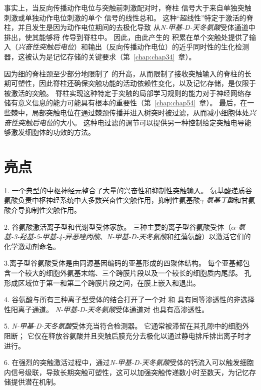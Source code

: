 事实上，当反向传播动作电位与突触前刺激配对时，脊柱  信号大于来自单独突触刺激或单独动作电位刺激的单个  信号的线性总和。
这种“超线性”特定于激活的脊柱，并且发生是因为动作电位期间的去极化导致  从\textit{N-甲基-D-天冬氨酸}受体通道中排出，使其能够将  传导到脊柱中。
因此，由此产生的  积累在单个突触处提供了输入（\textit{兴奋性突触后电位}）和输出（反向传播动作电位）的近乎同时性的生化检测器，这被认为是记忆存储的关键要求（第~\ref{chap:chap34}~章）。


因为细的脊柱颈至少部分地限制了  的升高，从而限制了接收突触输入的脊柱的长期可塑性，因此脊柱还确保突触功能的活动依赖性变化，以及记忆存储，是仅限于被激活的突触。
脊柱实现这种特定于突触的局部学习规则的能力对于神经网络存储有意义信息的能力可能具有根本的重要性（第~\ref{chap:chap54}~章）。
最后，在一些棘中，局部突触电位在通过棘颈传播并进入树突时被过滤，从而减小细胞体处\textit{兴奋性突触后电位}的大小。
这种电过滤的调节可以提供另一种控制给定突触电导能够激发细胞体的功效的方法。



\section{亮点}

1. 一个典型的中枢神经元整合了大量的兴奋性和抑制性突触输入。
氨基酸递质谷氨酸负责中枢神经系统中大多数兴奋性突触作用，抑制性氨基酸\textit{$\gamma$-氨基丁酸}和甘氨酸介导抑制性突触作用。


2. 谷氨酸激活离子型和代谢型受体家族。
三种主要的离子型谷氨酸受体（\textit{$\alpha$-氨基-3-羟基-5-甲基-4-异恶唑丙酸}、\textit{N-甲基-D-天冬氨酸}和红藻氨酸）以激活它们的化学激动剂命名。 


3.离子型谷氨酸受体是由同源基因编码的亚基形成的四聚体结构。 
每个亚基都包含一个较大的细胞外氨基末端、三个跨膜片段以及一个较长的细胞质内尾部。 
孔形成区域位于第一和第二个跨膜片段之间，在膜上嵌入和退出。


4. 谷氨酸与所有三种离子型受体的结合打开了一个对  和  具有同等渗透性的非选择性阳离子通道。
\textit{N-甲基-D-天冬氨酸}受体通道对  也具有高渗透性。


5. \textit{N-甲基-D-天冬氨酸}受体充当符合检测器。
它通常被滞留在其孔隙中的细胞外  阻断；
它仅在释放谷氨酸并且突触后膜充分去极化以通过静电排斥排出离子时才进行。 


6. 在强烈的突触激活过程中，通过\textit{N-甲基-D-天冬氨酸}受体的钙流入可以触发细胞内信号级联，导致长期突触可塑性，这可以加强突触传递数小时至数天，为记忆存储提供潜在机制。 


